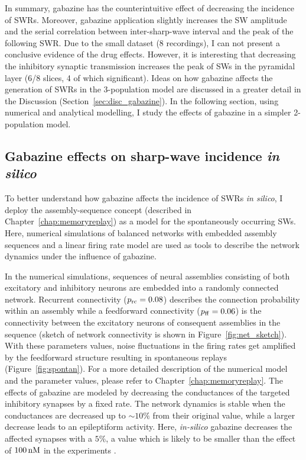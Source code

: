     In summary, gabazine has the counterintuitive effect of decreasing the
    incidence of SWRs. Moreover, gabazine application slightly increases the SW
    amplitude and the serial correlation between inter-sharp-wave interval and
    the peak of the following SWR. Due to the small dataset (8 recordings), I
    can not present a conclusive evidence of the drug effects. However, it is
    interesting that decreasing the inhibitory synaptic transmission increases
    the peak of SWs in the pyramidal layer (6/8 slices, 4 of which
    significant). Ideas on how gabazine affects the generation of SWRs in the
    3-population model are discussed in a greater detail in the Discussion
    (Section~\ref{sec:disc_gabazine}). In the following section, using
    numerical and analytical modelling, I study the effects of gabazine in a
    simpler 2-population model.

  \subsection{Gabazine effects on sharp-wave incidence {\textit {in silico} }}
    \label{sec:gabazine_insilico}
    To better understand how gabazine affects the incidence of SWRs
    {\textit {in silico}}, I deploy the assembly-sequence concept (described in
    Chapter~\ref{chap:memoryreplay}) as a model for the spontaneously occurring
    SWs. Here, numerical simulations of balanced networks with embedded assembly
    sequences and a linear firing rate model are used as tools to describe the
    network dynamics under the influence of gabazine.
      
    In the numerical simulations, sequences of neural assemblies consisting of
    both excitatory and inhibitory neurons are embedded into a randomly
    connected network. Recurrent connectivity ($p_{\rm rc}=0.08$) describes the
    connection probability within an assembly while a feedforward connectivity
    ($p_{\rm ff}=0.06$) is the connectivity between the excitatory neurons of
    consequent assemblies in the sequence (sketch of network connectivity is
    shown in Figure~\ref{fig:net_sketch}). With these parameters values, noise
    fluctuations in the firing rates get amplified by the feedforward structure
    resulting in spontaneous replays (Figure~\ref{fig:spontan}). For a more
    detailed description of the numerical model and the parameter values,
    please refer to Chapter~\ref{chap:memoryreplay}. The effects of gabazine
    are modeled by decreasing the conductances of the targeted inhibitory
    synapses by a fixed rate. The network dynamics is stable when the
    conductances are decreased up to $\sim 10\%$ from their original value,
    while a larger decrease leads to an epileptiform activity. Here,
    \textit{in-silico} gabazine decreases the affected synapses with a $5\%$, a
    value which is likely to be smaller than the effect of $100\,\rm nM$ in the
    experiments \citep{Nimmrich2005}.

